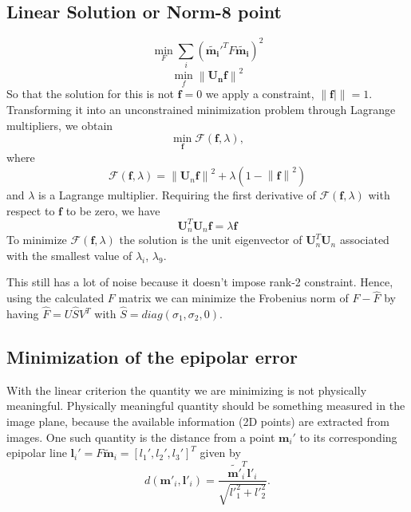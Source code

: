 \subsection{Linear Solution or Norm-8 point}
\begin{equation}
\min_F \sum_i (\mathbf{\widetilde{m_i}}'^TF \mathbf{\widetilde{m_i}})^2
\end{equation}
\begin{equation}
\min_f \left \| \mathbf{U_n} \mathbf{f} \right \|^2
\end{equation}
So that the solution for this is not  $\mathbf{f} = 0$ we apply a constraint, $\left \| \mathbf{f} | \right \| = 1$. Transforming it into an unconstrained minimization problem through Lagrange multipliers, we obtain 
\begin{equation}
\min_\mathbf{f} \mathcal{F}(\mathbf{f}, \lambda),
\end{equation}
where
\begin{equation}
\mathcal{F}(\mathbf{f}, \lambda) = \left \|\mathbf{U}_n\mathbf{f}\right \|^2 + \lambda(1-\left \|\mathbf{f}\right \|^2)
\end{equation}
and $\lambda$ is a Lagrange multiplier. Requiring the first derivative of $\mathcal{F}(\mathbf{f}, \lambda)$ with respect to $\mathbf{f}$ to be zero, we have
\begin{equation}
\mathbf{U}_n^T \mathbf{U}_n \mathbf{f} = \lambda \mathbf{f}
\end{equation}
To minimize $\mathcal{F}(\mathbf{f}, \lambda)$ the solution is the unit eigenvector of $\mathbf{U}_n^T \mathbf{U}_n$ associated with the smallest value of $\lambda_i$, $\lambda_9$.

This still has a lot of noise because it doesn't impose rank-2 constraint. Hence, using the calculated $F$ matrix we can minimize the Frobenius norm of $F-\hat{F}$ by having $\hat{F} = U\hat{S}V^T$ with $\hat{S} = diag(\sigma_1, \sigma_2, 0)$.



\subsection{Minimization of the epipolar error}

	With the linear criterion the quantity we are minimizing is not physically meaningful. Physically meaningful quantity should be something measured in
the image plane, because the available information (2D points) are extracted from images. One such quantity is the distance from a point $\mathbf{m}_i'$ to its corresponding epipolar line $\mathbf{l}_i' = F\mathbf{\widetilde{m}}_i = [l_1', l_2', l_3']^T$ given by
\begin{equation}
d(\mathbf{m'}_i, \mathbf{l'}_i) = \frac{\mathbf{\widetilde{m'}}_i^T\mathbf{l'}_i}{\sqrt{{l'}_1^2+{l'}_2^2}}.
\end{equation}

